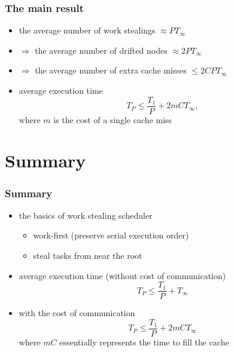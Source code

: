 \documentclass[12pt,dvipdfmx]{beamer}
\begin{document}
\begin{frame}
\frametitle{The main result}
\begin{itemize}
\item the average number of work stealings $\approx PT_\infty$ 
\item $\Rightarrow$ the average number of drifted nodes
  $\approx 2PT_\infty$ 
\item $\Rightarrow$ the average number of extra cache misses
  $\leq 2CPT_\infty$ 
\item average execution time
\[ T_P \leq \frac{T_1}{P} + 2m CT_\infty, \]
where $m$ is the cost of a single cache miss
\end{itemize}
\end{frame}

\section{Summary}
\begin{frame}
\frametitle{Summary}

\begin{itemize}
\item the basics of work stealing scheduler
  \begin{itemize}
  \item work-first (preserve serial execution order)
  \item steal tasks from near the root
  \end{itemize}
\item average execution time (without cost of communication)
\[ T_P \leq \frac{T_1}{P} + T_\infty \]
\item with the cost of communication
\[ T_P \leq \frac{T_1}{P} + 2mCT_\infty \]
where $mC$ essentially represents the time to fill the cache
\end{itemize}
\end{frame}
\end{document}
